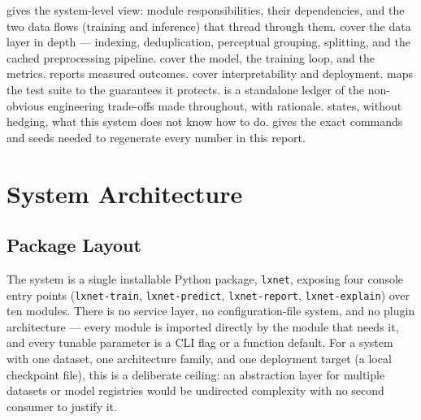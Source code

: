 \documentclass[11pt,a4paper,oneside]{report}
\newcommand{\code}[1]{\texttt{\small #1}}
\begin{document}
 gives the system-level view: module responsibilities,
their dependencies, and the two data flows (training and inference) that
thread through them.  cover the data layer
in depth --- indexing, deduplication, perceptual grouping, splitting, and the
cached preprocessing pipeline. 
cover the model, the training loop, and the metrics. 
reports measured outcomes.  cover interpretability
and deployment.  maps the test suite to the guarantees it
protects.  is a standalone ledger of the non-obvious
engineering trade-offs made throughout, with rationale. 
states, without hedging, what this system does not know how to do.
 gives the exact commands and seeds needed to
regenerate every number in this report.

\chapter{System Architecture}
\label{ch:architecture}

\section{Package Layout}

The system is a single installable Python package, \code{lxnet}, exposing
four console entry points (\code{lxnet-train}, \code{lxnet-predict},
\code{lxnet-report}, \code{lxnet-explain}) over ten modules. There is no
service layer, no configuration-file system, and no plugin architecture ---
every module is imported directly by the module that needs it, and every
tunable parameter is a CLI flag or a function default. For a system with one
dataset, one architecture family, and one deployment target (a local
checkpoint file), this is a deliberate ceiling: an abstraction layer for
multiple datasets or model registries would be undirected complexity with no
second consumer to justify it.
\end{document}
